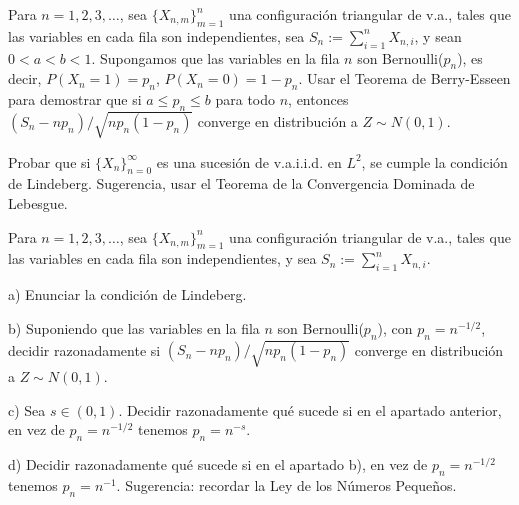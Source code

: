 
\begin{problem}[9]Para $n=1, 2, 3, \dots$, sea  $\{X_{n,m}\}_{m=1}^{n}$  una configuraci\'on triangular de v.a., tales que las variables en cada fila son independientes, sea $S_{n} := \sum_{i=1}^n X_{n,i}$, y sean $0 < a < b < 1$. Supongamos que las
variables en la fila $n$ son Bernoulli($p_n$), es decir, $P(X_n = 1) = p_n$, $P(X_n = 0) = 1 - p_n$.
Usar el Teorema de Berry-Esseen para demostrar que si $a \le p_n \le b$ para todo $n$,
entonces $(S_n - n p_n)/\sqrt{n p_n (1 - p_n)}$ converge en distribuci\'on a $Z\sim N(0,1)$.
\solution

\begin{expla}

\end{expla}

\end{problem}


\begin{problem}[10]Probar que si $\{X_n\}_{n=0}^{\infty}$  es una sucesi\'on de v.a.i.i.d. en $L^2$, se cumple
la condici\'on de Lindeberg. Sugerencia, usar el Teorema de la Convergencia Dominada de
Lebesgue.
\solution

\begin{expla}

\end{expla}

\end{problem}


\begin{problem}[11] Para $n=1, 2, 3, \dots$, sea  $\{X_{n, m}\}_{m=1}^{n}$  una configuraci\'on triangular de v.a., tales que las variables en cada fila son independientes, y sea $S_{n} := \sum_{i=1}^n X_{n, i}$.

a) Enunciar la condici\'on de Lindeberg.

b) Suponiendo que las variables en la fila $n$ son Bernoulli($p_n$), con
$p_n = n^{- 1/2}$,
decidir razonadamente
si 
$(S_n - n p_n)/\sqrt{n p_n (1 - p_n)}$ converge en distribuci\'on a $Z\sim N(0,1)$.

c) Sea $s \in (0,1)$. Decidir razonadamente qu\'e sucede si en el apartado anterior, en
vez de  $p_n = n^{ - 1/2}$ tenemos $p_n = n^{ - s}$.

d) Decidir razonadamente qu\'e sucede si en el apartado b), en
vez de  $p_n = n^{- 1/2}$ tenemos $p_n = n^{ - 1}$.
Sugerencia: recordar la Ley de los N\'umeros Peque\~nos.
\solution

\begin{expla}

\end{expla}

\end{problem}

